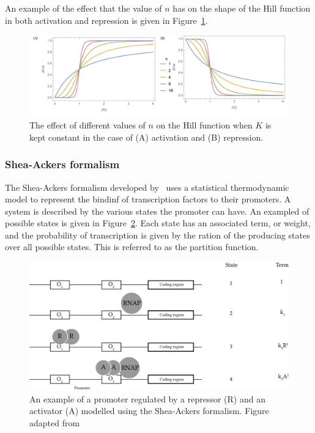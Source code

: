 \noindent An example of the effect that the value of $n$ has on the shape of the Hill function in both activation and repression is given in Figure~\ref{fig:hill_ex}.
\newpage

\begin{figure}[htb]
\centerfloat
    \includegraphics[scale=0.6]{../../chapters/chapterBackgr/images/hill_both-01.png}
    \caption[Hill formalism example]{The effect of different values of $n$ on the Hill function when $K$ is kept constant in the case of (A) activation and (B) repression.}
    \label{fig:hill_ex}
\end{figure}



\subsubsection{Shea-Ackers formalism}
\label{sec:shea-ackers}
The Shea-Ackers formalism developed by~\textcite{Ackers:1982tq} uses a statistical thermodynamic model to represent the bindinf of transcription factors to their promoters. A system is described by the various states the promoter can have. An exampled of possible states is given in Figure~\ref{fig:shea_ack_ex}. Each state has an associated term, or weight, and the probability of transcription is given by the ration of the producing states over all possible states. This is referred to as the partition function. 

\begin{figure}[htb]
\centerfloat
    \includegraphics[scale=0.8]{../../chapters/chapterBackgr/images/shea-ackers.png}
    \caption[Shea-Ackers formalism example]{An example of a promoter regulated by a repressor (R) and an activator (A) modelled using the Shea-Ackers formalism. Figure adapted from~\textcite{Woods:2016eh}}
    \label{fig:shea_ack_ex}
\end{figure}


